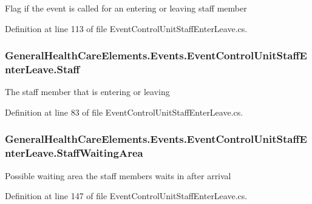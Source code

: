 Flag if the event is called for an entering or leaving staff member 



Definition at line 113 of file Event\+Control\+Unit\+Staff\+Enter\+Leave.\+cs.

\subsubsection[{\texorpdfstring{Staff}{Staff}}]{ General\+Health\+Care\+Elements.\+Events.\+Event\+Control\+Unit\+Staff\+Enter\+Leave.\+Staff\hspace{0.3cm}{\ttfamily [get]}}\hypertarget{class_general_health_care_elements_1_1_events_1_1_event_control_unit_staff_enter_leave_a3da4da7b0e7aef04a20e243946b8a324}{}\label{class_general_health_care_elements_1_1_events_1_1_event_control_unit_staff_enter_leave_a3da4da7b0e7aef04a20e243946b8a324}


The staff member that is entering or leaving 



Definition at line 83 of file Event\+Control\+Unit\+Staff\+Enter\+Leave.\+cs.

\subsubsection[{\texorpdfstring{Staff\+Waiting\+Area}{StaffWaitingArea}}]{ General\+Health\+Care\+Elements.\+Events.\+Event\+Control\+Unit\+Staff\+Enter\+Leave.\+Staff\+Waiting\+Area\hspace{0.3cm}{\ttfamily [get]}}\hypertarget{class_general_health_care_elements_1_1_events_1_1_event_control_unit_staff_enter_leave_a9319335f7851e25630b6bb115d335366}{}\label{class_general_health_care_elements_1_1_events_1_1_event_control_unit_staff_enter_leave_a9319335f7851e25630b6bb115d335366}


Possible waiting area the staff members waits in after arrival 



Definition at line 147 of file Event\+Control\+Unit\+Staff\+Enter\+Leave.\+cs.

